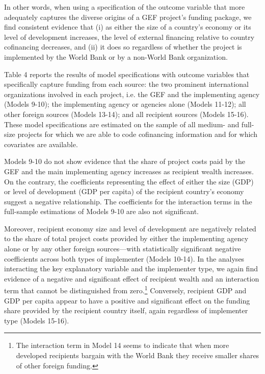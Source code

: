 \documentclass{article}
\begin{document}
In other words, when using a specification of the outcome variable that more adequately captures the diverse origins of a GEF project’s funding package, we find consistent evidence that (i) as either the size of a country’s economy or its level of development increases, the level of external financing relative to country cofinancing decreases, and (ii) it does so regardless of whether the project is implemented by the World Bank or by a non-World Bank organization. 

Table 4 reports the results of model specifications with outcome variables that specifically capture funding from each source: the two prominent international organizations involved in each project, i.e. the GEF and the implementing agency (Models 9-10); the implementing agency or agencies alone (Models 11-12); all other foreign sources (Models 13-14); and all recipient sources (Models 15-16).  These model specifications are estimated on the sample of all medium- and full-size projects for which we are able to code cofinancing information and for which covariates are available. 

Models 9-10 do not show evidence that the share of project costs paid by the GEF and the main implementing agency increases as recipient wealth increases.  On the contrary, the coefficients representing the effect of either the size (GDP) or level of development (GDP per capita) of the recipient country’s economy suggest a negative relationship.  The coefficients for the interaction terms in the full-sample estimations of Models 9-10 are also not significant. 

Moreover, recipient economy size and level of development are negatively related to the share of total project costs provided by either the implementing agency alone or by any other foreign sources---with statistically significant negative coefficients across both types of implementer (Models 10-14).  In the analyses interacting the key explanatory variable and the implementer type, we again find evidence of a negative and significant effect of recipient wealth and an interaction term that cannot be distinguished from zero.\footnote{The interaction term in Model 14 seems to indicate that when more developed recipients bargain with the World Bank they receive smaller shares of other foreign funding.}   Conversely, recipient GDP and GDP per capita appear to have a positive and significant effect on the funding share provided by the recipient country itself, again regardless of implementer type (Models 15-16). 
\end{document}

